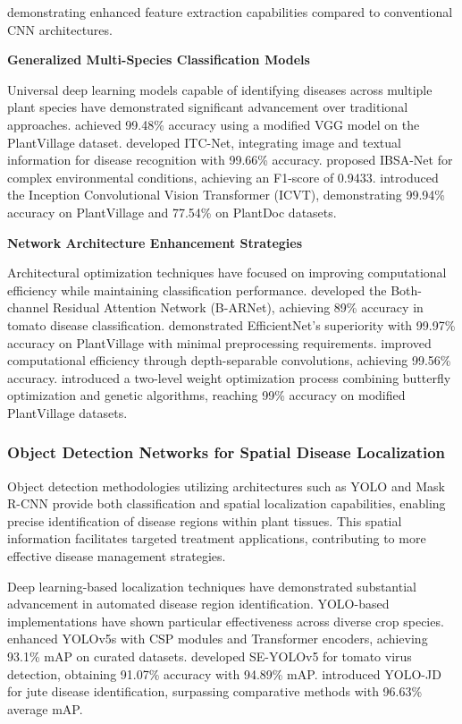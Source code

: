 \documentclass[sn-mathphys]{sn-jnl}
\theoremstyle{thmstyleone}%
\theoremstyle{thmstyletwo}%
\theoremstyle{thmstylethree}%
\begin{document}
demonstrating enhanced feature extraction capabilities compared to conventional CNN architectures.




\textbf{Generalized Multi-Species Classification Models}

Universal deep learning models capable of identifying diseases across multiple plant species have demonstrated significant advancement over traditional approaches. \citet{ferentinos2018deep} achieved 99.48\% accuracy using a modified VGG model on the PlantVillage dataset. \citet{wang2021few} developed ITC-Net, integrating image and textual information for disease recognition with 99.66\% accuracy. \citet{zhang2023ibsa_net} proposed IBSA-Net for complex environmental conditions, achieving an F1-score of 0.9433. \citet{yu2023inception} introduced the Inception Convolutional Vision Transformer (ICVT), demonstrating 99.94\% accuracy on PlantVillage and 77.54\% on PlantDoc datasets.

\textbf{Network Architecture Enhancement Strategies}

Architectural optimization techniques have focused on improving computational efficiency while maintaining classification performance. \citet{chen2020identification} developed the Both-channel Residual Attention Network (B-ARNet), achieving 89\% accuracy in tomato disease classification. \citet{atila2021plant} demonstrated EfficientNet's superiority with 99.97\% accuracy on PlantVillage with minimal preprocessing requirements. \citet{hassan2021identification} improved computational efficiency through depth-separable convolutions, achieving 99.56\% accuracy. \citet{ruth2022meta} introduced a two-level weight optimization process combining butterfly optimization and genetic algorithms, reaching 99\% accuracy on modified PlantVillage datasets.


\subsubsection{Object Detection Networks for Spatial Disease Localization}

Object detection methodologies utilizing architectures such as YOLO and Mask R-CNN provide both classification and spatial localization capabilities, enabling precise identification of disease regions within plant tissues. This spatial information facilitates targeted treatment applications, contributing to more effective disease management strategies.

Deep learning-based localization techniques have demonstrated substantial advancement in automated disease region identification. YOLO-based implementations have shown particular effectiveness across diverse crop species. \citet{li2022improved} enhanced YOLOv5s with CSP modules and Transformer encoders, achieving 93.1\% mAP on curated datasets. \citet{qi2022improved} developed SE-YOLOv5 for tomato virus detection, obtaining 91.07\% accuracy with 94.89\% mAP. \citet{li2022yolo} introduced YOLO-JD for jute disease identification, surpassing comparative methods with 96.63\% average mAP.
\end{document}

